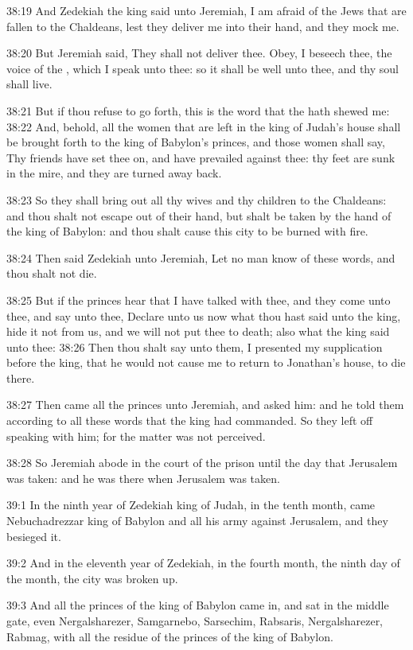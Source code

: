 38:19 And Zedekiah the king said unto Jeremiah, I am afraid of the
Jews that are fallen to the Chaldeans, lest they deliver me into their
hand, and they mock me.

38:20 But Jeremiah said, They shall not deliver thee. Obey, I beseech
thee, the voice of the \LORD, which I speak unto thee: so it shall be
well unto thee, and thy soul shall live.

38:21 But if thou refuse to go forth, this is the word that the \LORD
hath shewed me: 38:22 And, behold, all the women that are left in the
king of Judah's house shall be brought forth to the king of Babylon's
princes, and those women shall say, Thy friends have set thee on, and
have prevailed against thee: thy feet are sunk in the mire, and they
are turned away back.

38:23 So they shall bring out all thy wives and thy children to the
Chaldeans: and thou shalt not escape out of their hand, but shalt be
taken by the hand of the king of Babylon: and thou shalt cause this
city to be burned with fire.

38:24 Then said Zedekiah unto Jeremiah, Let no man know of these
words, and thou shalt not die.

38:25 But if the princes hear that I have talked with thee, and they
come unto thee, and say unto thee, Declare unto us now what thou hast
said unto the king, hide it not from us, and we will not put thee to
death; also what the king said unto thee: 38:26 Then thou shalt say
unto them, I presented my supplication before the king, that he would
not cause me to return to Jonathan's house, to die there.

38:27 Then came all the princes unto Jeremiah, and asked him: and he
told them according to all these words that the king had commanded. So
they left off speaking with him; for the matter was not perceived.

38:28 So Jeremiah abode in the court of the prison until the day that
Jerusalem was taken: and he was there when Jerusalem was taken.

39:1 In the ninth year of Zedekiah king of Judah, in the tenth month,
came Nebuchadrezzar king of Babylon and all his army against
Jerusalem, and they besieged it.

39:2 And in the eleventh year of Zedekiah, in the fourth month, the
ninth day of the month, the city was broken up.

39:3 And all the princes of the king of Babylon came in, and sat in
the middle gate, even Nergalsharezer, Samgarnebo, Sarsechim, Rabsaris,
Nergalsharezer, Rabmag, with all the residue of the princes of the
king of Babylon.

